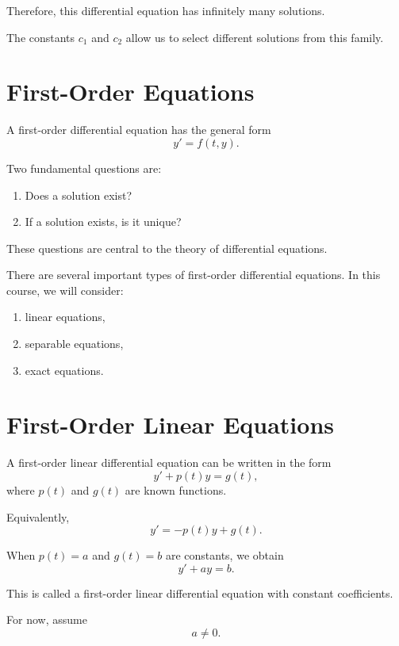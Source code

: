 \documentclass[11pt]{article}
\begin{document}
Therefore, this differential equation has infinitely many solutions.

The constants \(c_1\) and \(c_2\) allow us to select different solutions from this family.

\section{First-Order Equations}

A first-order differential equation has the general form
\[
y'=f(t,y).
\]

Two fundamental questions are:

\begin{enumerate}
    \item Does a solution exist?
    \item If a solution exists, is it unique?
\end{enumerate}

These questions are central to the theory of differential equations.

There are several important types of first-order differential equations. In this course, we will consider:

\begin{enumerate}
    \item linear equations,
    \item separable equations,
    \item exact equations.
\end{enumerate}

\section{First-Order Linear Equations}

A first-order linear differential equation can be written in the form
\[
y'+p(t)y=g(t),
\]
where \(p(t)\) and \(g(t)\) are known functions.

Equivalently,
\[
y'=-p(t)y+g(t).
\]

When \(p(t)=a\) and \(g(t)=b\) are constants, we obtain
\[
y'+ay=b.
\]

This is called a first-order linear differential equation with constant coefficients.

For now, assume
\[
a\neq 0.
\]
\end{document}
